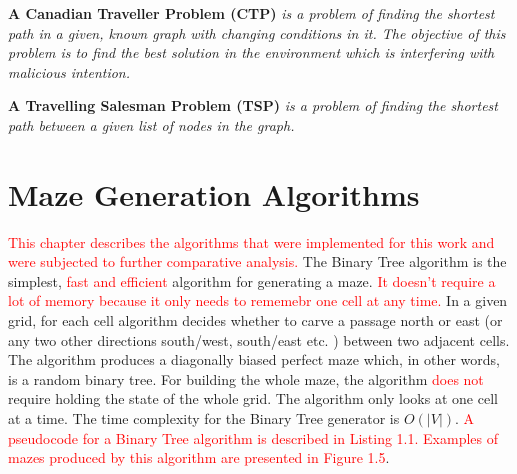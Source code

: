 \begin{definition}\textbf{A Canadian Traveller Problem (CTP)} \emph{is a problem of finding the shortest path in a given, known graph with changing conditions in it. The objective of this problem is to find the best solution in the environment which is interfering with malicious intention.}\end{definition}
\begin{definition}\textbf{A Travelling Salesman Problem (TSP)} \emph{is a problem of finding the shortest path between a given list of nodes in the graph.} \end{definition}

\section{Maze Generation Algorithms}
\textcolor{red}{This chapter describes the algorithms that were implemented for this work and were subjected to further comparative analysis.}
The Binary Tree algorithm \textcolor{red}{\cite{Cormen}} is the simplest, \textcolor{red}{fast and efficient} algorithm for generating a maze. \textcolor{red}{It doesn't require a lot of memory because it only needs to rememebr one cell at any time.} In a given grid, for each cell algorithm decides whether to carve a passage north or east (or any two other directions south/west, south/east etc. ) between two adjacent cells. The algorithm produces a diagonally biased perfect maze which, in other words, is a random binary tree. For building the whole maze, the algorithm \textcolor{red}{does not} require holding the state of the whole grid. The algorithm only looks at one cell at a time. The time complexity for the Binary Tree generator is $O(|V|)$. \textcolor{red}{A pseudocode for a Binary Tree algorithm is described in Listing 1.1. Examples of mazes produced by this algorithm are presented in Figure 1.5}.
